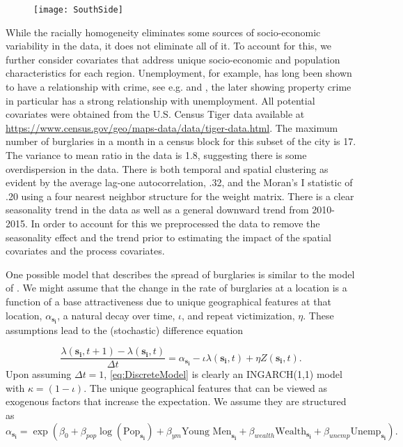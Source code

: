 \documentclass[11pt]{isuthesis}
\begin{document}
\begin{figure}[!htp]
	\centering
	\texttt{[image: SouthSide]}
	\label{fig:SouthSide}
\end{figure}


While the racially homogeneity eliminates some sources of socio-economic variability in the data, it does not eliminate all of it.  To account for this, we further consider covariates that address unique socio-economic and population characteristics for each region. Unemployment, for example, has long been shown to have a relationship with crime, see e.g. \cite{britt1994crime} and \cite{raphael2001identifying}, the later showing property crime in particular has a strong relationship with unemployment.  All potential covariates were obtained from the U.S. Census Tiger data available at \href{https://www.census.gov/geo/maps-data/data/tiger-data.html}{https://www.census.gov/geo/maps-data/data/tiger-data.html}.  The maximum number of burglaries in a month in a census block for this subset of the city is 17.  The variance to mean ratio in the data is 1.8, suggesting there is some overdispersion in the data.  There is both temporal and spatial clustering as evident by the average lag-one autocorrelation, .32, and the Moran's I statistic of .20 using a four nearest neighbor structure for the weight matrix.  There is a clear seasonality trend in the data as well as a general downward trend from 2010-2015.  In order to account for this we preprocessed the data to remove the seasonality effect and the trend prior to estimating the impact of the spatial covariates and the process covariates.

One possible model that describes the spread of burglaries is similar to the model of \cite{short2008statistical}.  We might assume that the change in the rate of burglaries at a location is a function of a base attractiveness due to unique geographical features at that location, $\alpha_{\boldsymbol{s_i}}$, a natural decay over time, $\iota$, and repeat victimization, $\eta$.  These assumptions lead to the (stochastic) difference equation

\begin{equation}
	\frac{\lambda(\boldsymbol{s_i},t+1)-\lambda(\boldsymbol{s_i},t)}{\Delta t}=\alpha_{\boldsymbol{s_i}}-\iota \lambda(\boldsymbol{s_i},t)+\eta Z(\boldsymbol{s_i},t)\label{eq:DiscreteModel}.
\end{equation}
Upon assuming $\Delta t=1$, \eqref{eq:DiscreteModel} is clearly an INGARCH(1,1) model with $\kappa=(1-\iota)$.  The unique geographical features that can be viewed as exogenous factors that increase the expectation.  We assume they are structured as
\begin{equation}
	\alpha_{\boldsymbol{s_i}}=\exp\left(\beta_0+\beta_{pop} \log(\mbox{Pop}_{\boldsymbol{s_i}})+\beta_{ym}\mbox{Young Men}_{\boldsymbol{s_i}}+\beta_{wealth}\mbox{Wealth}_{\boldsymbol{s_i}}+\beta_{unemp}\mbox{Unemp}_{\boldsymbol{s_i}}\right) \label{eq:mean strucutre}.
\end{equation}
\end{document}
